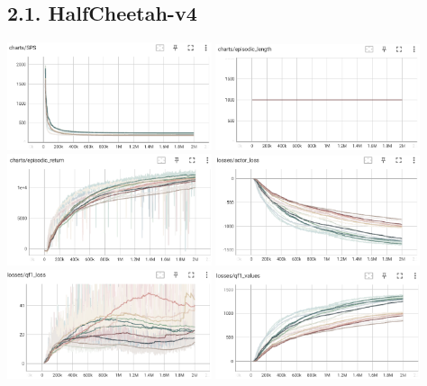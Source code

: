 \documentclass[english, a4paper,12pt]{article}
\begin{document}
\newpage
\subsection*{2.1. HalfCheetah-v4}

\includegraphics[width=6cm]{SPS_hf.png}
\includegraphics[width=6cm]{episodic_length_hf.png}
\includegraphics[width=6cm]{episodic_return_hf.png}
\includegraphics[width=6cm]{actor_loss_hf.png}
\includegraphics[width=6cm]{qf1_loss_hf.png}
\includegraphics[width=6cm]{qf1_values_hf.png}
\end{document}
